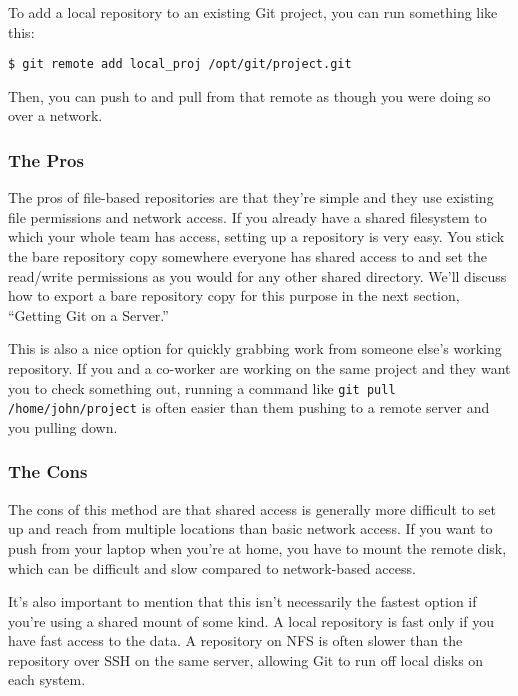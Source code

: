 \documentclass[a4paper]{book}
\begin{document}
To add a local repository to an existing Git project, you can run something like this:

\begin{shaded}\begin{verbatim}
$ git remote add local_proj /opt/git/project.git
\end{verbatim}\end{shaded}

Then, you can push to and pull from that remote as though you were doing so over a network.

\subsubsection{The Pros}

The pros of file-based repositories are that they're simple and they use existing file permissions and network access. If you already have a shared filesystem to which your whole team has access, setting up a repository is very easy. You stick the bare repository copy somewhere everyone has shared access to and set the read/write permissions as you would for any other shared directory. We'll discuss how to export a bare repository copy for this purpose in the next section, “Getting Git on a Server.”

This is also a nice option for quickly grabbing work from someone else's working repository. If you and a co-worker are working on the same project and they want you to check something out, running a command like \texttt{git pull /home/john/project} is often easier than them pushing to a remote server and you pulling down.

\subsubsection{The Cons}

The cons of this method are that shared access is generally more difficult to set up and reach from multiple locations than basic network access. If you want to push from your laptop when you're at home, you have to mount the remote disk, which can be difficult and slow compared to network-based access.

It's also important to mention that this isn't necessarily the fastest option if you're using a shared mount of some kind. A local repository is fast only if you have fast access to the data. A repository on NFS is often slower than the repository over SSH on the same server, allowing Git to run off local disks on each system.
\end{document}
